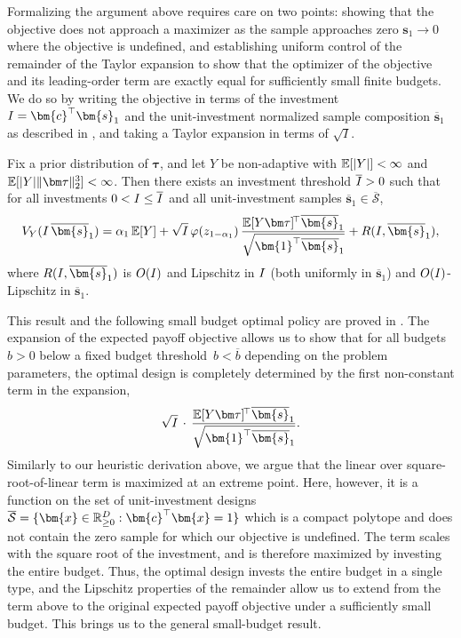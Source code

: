Formalizing the argument above requires care on two points: showing that the objective does not approach a maximizer as the sample approaches zero $\bm{s}_1\to 0$ where the objective is undefined, and establishing uniform control of the remainder of the Taylor expansion to show that the optimizer of the objective and its leading-order term are exactly equal for sufficiently small finite budgets.
We do so by writing the objective in terms of the investment $\invst=\bm{c}^\top \bm{s}_1$ and the unit-investment normalized sample composition $\overline{\bm{s}}_1$ as described in , and taking a Taylor expansion in terms of $\sqrt{I}$.

\begin{proposition}
  \label{prop:small-investment-expansion}
  Fix a prior distribution of $\bm\tau$, and let $Y$ be non-adaptive with $\mathbb{E}[|Y|]<\infty$ and $\E[|Y|\|\bm\tau\|_2^3]<\infty$.
  Then there exists an investment threshold $\overline{I}>0$ such that for all investments $0 < I \le \overline{I}$ and all unit-investment samples $\overline{\bm{s}}_1\in\overline{\mathcal{S}}$,
  \[
    V_Y(\invst\,\overline{\bm{s}}_1)
    =
    \alpha_1\, \E[Y]
    +\sqrt{\invst}\,\varphi(z_{1-\alpha_1})\,
    \frac{\E[Y\bm\tau]^{\!\top}\overline{\bm{s}}_1}{\sqrt{\bm{1}^{\top}\overline{\bm{s}}_1}}
    +R(\invst,\overline{\bm{s}}_1),
  \]
  where $R(\invst,\overline{\bm{s}}_1)$ is $O(I)$ and Lipschitz in $I$ (both uniformly in $\overline{\bm{s}}_1$) and $O(I)$-Lipschitz in $\overline{\bm{s}}_1$.
\end{proposition}

This result and the following small budget optimal policy are proved in .
The expansion of the expected payoff objective allows us to show that for all budgets~$b>0$ below a fixed budget threshold~$b<\overline{b}$ depending on the problem parameters, the optimal design is completely determined by the first non-constant term in the expansion,
\[
  \sqrt{\invst}\,\cdot\,
  \frac{\E[Y\bm\tau]^{\!\top}\overline{\bm{s}}_1}{\sqrt{\bm{1}^{\top}\overline{\bm{s}}_1}}.
\]
Similarly to our heuristic derivation above, we argue that the linear over square-root-of-linear term is maximized at an extreme point.
Here, however, it is a function on the set of unit-investment designs $\overline{\mathcal{S}}=\{\bm{x}\in\R^D_{\ge 0} : \bm{c}^{\top}\bm{x}=1\}$ which is a compact polytope and does not contain the zero sample for which our objective is undefined.
The term scales with the square root of the investment, and is therefore maximized by investing the entire budget.
Thus, the optimal design invests the entire budget in a single type, and the Lipschitz properties of the remainder allow us to extend from the term above to the original expected payoff objective under a sufficiently small budget.
This brings us to the general small-budget result.

